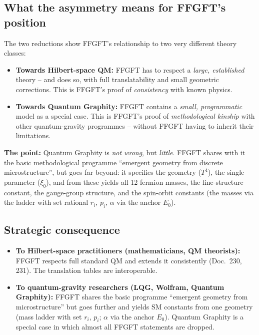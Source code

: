 \subsection{What the asymmetry means for FFGFT's position}

The two reductions show FFGFT's relationship to two very different
theory classes:

\begin{itemize}[leftmargin=2em,itemsep=2pt,topsep=2pt]
  \item \textbf{Towards Hilbert-space QM:} FFGFT has to respect a
        \emph{large, established} theory -- and does so, with full
        translatability and small geometric corrections. This is
        FFGFT's proof of \emph{consistency} with known physics.

  \item \textbf{Towards Quantum Graphity:} FFGFT contains a
        \emph{small, programmatic} model as a special case. This is
        FFGFT's proof of \emph{methodological kinship} with other
        quantum-gravity programmes -- without FFGFT having to inherit
        their limitations.
\end{itemize}

\textbf{The point:} Quantum Graphity is \emph{not wrong}, but
\emph{little}. FFGFT shares with it the basic methodological
programme \enquote{emergent geometry from discrete microstructure},
but goes far beyond: it specifies the geometry ($T^4$), the single
parameter ($\xi_0$), and from these yields all 12 fermion masses,
the fine-structure constant, the gauge-group structure, and the
spin-orbit constants (the masses via the ladder with set rational
$r_i$, $p_i$, $\alpha$ via the anchor $E_0$).

\subsection{Strategic consequence}

\begin{itemize}[leftmargin=2em,itemsep=2pt,topsep=2pt]
  \item \textbf{To Hilbert-space practitioners (mathematicians,
        QM theorists):} FFGFT respects full standard QM and extends
        it consistently (Doc.~230, 231). The translation tables are
        interoperable.

  \item \textbf{To quantum-gravity researchers (LQG, Wolfram,
        Quantum Graphity):} FFGFT shares the basic programme
        \enquote{emergent geometry from microstructure} but goes
        further and yields SM constants from one geometry (mass
        ladder with set $r_i$, $p_i$; $\alpha$ via the anchor $E_0$).
        Quantum
        Graphity is a special case in which almost all FFGFT
        statements are dropped.
\end{itemize}

